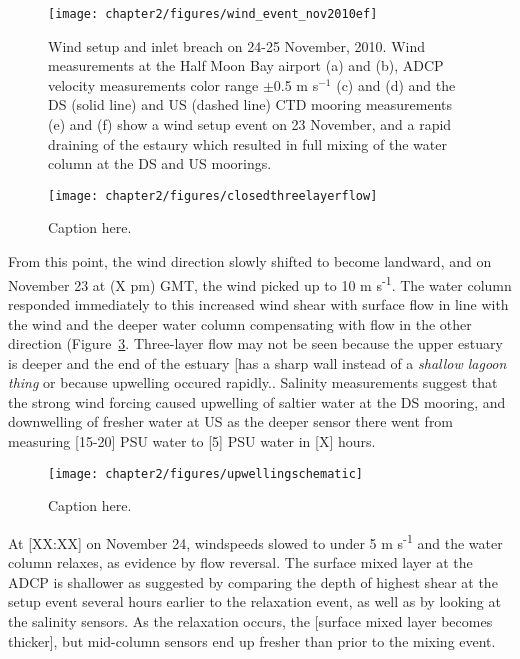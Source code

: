 \begin{figure}[t]
	\centering
	\texttt{[image: chapter2/figures/wind\_event\_nov2010ef]}
\caption{Wind setup and inlet breach on 24-25 November, 2010. Wind measurements at the Half Moon Bay airport (a) and (b), ADCP velocity measurements color range $\pm $0.5 m s$^{-1}$ (c) and (d) and the DS (solid line) and US (dashed line) CTD mooring measurements (e) and (f) show a wind setup event on 23 November, and a rapid draining of the estaury which resulted in full mixing of the water column at the DS and US moorings.}
\label{fig:closed_UVwindsalt}
\end{figure}


\begin{figure}
	\centering
	\texttt{[image: chapter2/figures/closedthreelayerflow]}
\caption{Caption here.} \label{fig:schematic3lf}
\end{figure}


From this point, the wind direction slowly shifted to become landward, and on November 23 at (X pm) GMT, the wind picked up to 10 m s\textsuperscript{-1}. The water column responded immediately to this increased wind shear with surface flow in line with the wind and the  deeper water column compensating with flow in the other direction (Figure~\ref{fig:schematicupwelling}. Three-layer flow may not be seen because the upper estuary is deeper and the end of the estuary [has a sharp wall instead of a \emph{shallow lagoon thing} or because upwelling occured rapidly.. Salinity measurements suggest that the strong wind forcing caused upwelling of saltier water at the DS mooring, and downwelling of fresher water at US as the deeper sensor there went from measuring [15-20] PSU water to [5] PSU water in [X] hours.


\begin{figure}
\centering
	\texttt{[image: chapter2/figures/upwellingschematic]}
\caption{Caption here.} \label{fig:schematicupwelling}
\end{figure}

At [XX:XX] on November 24, windspeeds slowed to under 5 m s\textsuperscript{-1} and the water column relaxes, as evidence by flow reversal. The surface mixed layer at the ADCP is shallower as suggested by comparing the depth of highest shear at the setup event several hours earlier to the relaxation event, as well as by looking at the salinity sensors. As the relaxation occurs, the [surface mixed layer becomes
thicker], but mid-column sensors end up fresher than prior to the mixing event. 

